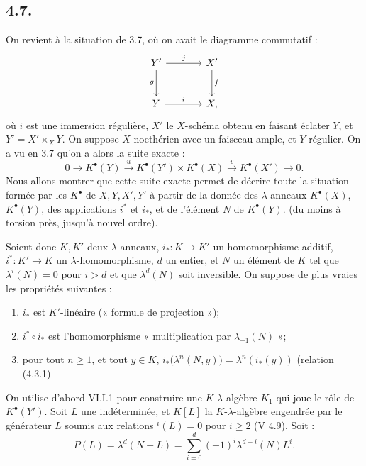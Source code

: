 
\subsection*{4.7.}

On
revient à la situation de 3.7, où on avait le diagramme commutatif :
\[
\begin{tikzcd}[column sep=large,row sep=large]
Y' \arrow[r,"j"] \arrow[d,"g"'] & X' \arrow[d,"f"]\\
Y \arrow[r,"i"] & X,
\end{tikzcd}
\]
où \(i\) est une immersion régulière, \(X'\) le \(X\)-schéma obtenu en faisant éclater \(Y\), et \(Y'=X'\times_XY\). On suppose \(X\) noethérien avec un faisceau ample, et \(Y\) régulier. On a vu en 3.7 qu'on a alors la suite exacte :
\[
0\longrightarrow K^{\bullet}(Y)\xrightarrow{u}
K^{\bullet}(Y')\times K^{\bullet}(X)\xrightarrow{v}
K^{\bullet}(X')\longrightarrow0.
\]
Nous allons montrer que cette suite exacte permet de décrire toute la situation formée par les \(K^{\bullet}\) de \(X,Y,X',Y'\) à partir de la donnée des \(\lambda\)-anneaux \(K^{\bullet}(X)\), \(K^{\bullet}(Y)\), des applications \(i^*\) et \(i_*\), et de l'élément \(N\) de \(K^{\bullet}(Y)\). (du moins à torsion près, jusqu'à nouvel ordre).

Soient donc \(K,K'\) deux \(\lambda\)-anneaux, \(i_*:K\to K'\) un homomorphisme additif, \(i^*:K'\to K\) un \(\lambda\)-homomorphisme, \(d\) un entier, et \(N\) un élément de \(K\) tel que \(\lambda^i(N)=0\) pour \(i>d\) et que \(\lambda^d(N)\) soit inversible. On suppose de plus vraies les propriétés suivantes :
\begin{enumerate}[label=\roman*)]
\item \(i_*\) est \(K'\)-linéaire (« formule de projection »);
\item \(i^*\circ i_*\) est l'homomorphisme « multiplication par \(\lambda_{-1}(N)\) »;
\item pour tout \(n\ge1\), et tout \(y\in K\), \(i_*\bigl(\lambda^n(N,y)\bigr)=\lambda^n(i_*(y))\) (relation (4.3.1)
\end{enumerate}

On utilise d'abord VI.I.1 pour construire une \(K\)-\(\lambda\)-algèbre \(K_1\) qui joue le rôle de \(K^{\bullet}(Y')\). Soit \(L\) une indéterminée, et \(K[L]\) la \(K\)-\(\lambda\)-algèbre engendrée par le générateur \(L\) soumis aux relations \({}^i(L)=0\) pour \(i\ge2\) (V 4.9). Soit :
\[
  P(L)=\lambda^d(N-L)=\sum_{i=0}^{d}(-1)^i\lambda^{d-i}(N)L^i.
\]

